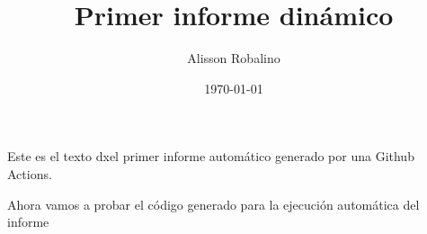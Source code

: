 \documentclass[12pt, a4paper]{book}
\title{Primer informe dinámico}
\author{Alisson Robalino}
\date{\today}
\begin{document}
\maketitle
Este es el texto dxel primer informe automático generado por una Github Actions.

Ahora vamos a probar el código generado para la ejecución automática del informe
\end{document}
